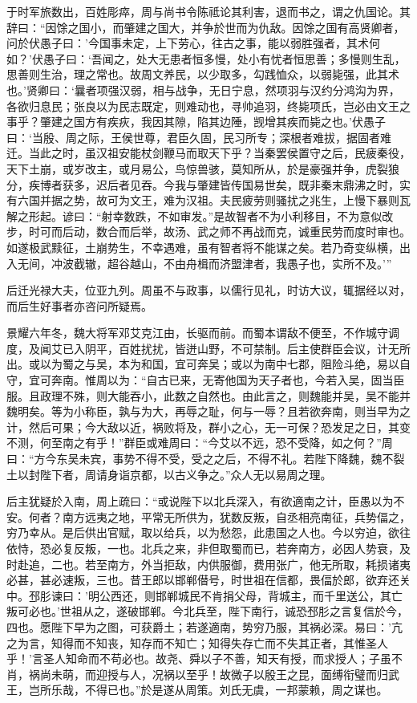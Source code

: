 \documentclass[12pt,UTF8]{ctexbook}
\begin{document}
于时军旅数出，百姓彫瘁，周与尚书令陈祗论其利害，退而书之，谓之仇国论。其辞曰：“因馀之国小，而肇建之国大，并争於世而为仇敌。因馀之国有高贤卿者，问於伏愚子曰：'今国事未定，上下劳心，往古之事，能以弱胜强者，其术何如？'伏愚子曰：‘吾闻之，处大无患者恒多慢，处小有忧者恒思善；多慢则生乱，思善则生治，理之常也。故周文养民，以少取多，勾践恤众，以弱毙强，此其术也。’贤卿曰：‘曩者项强汉弱，相与战争，无日宁息，然项羽与汉约分鸿沟为界，各欲归息民；张良以为民志既定，则难动也，寻帅追羽，终毙项氏，岂必由文王之事乎？肇建之国方有疾疢，我因其隙，陷其边陲，觊增其疾而毙之也。’伏愚子曰：‘当殷、周之际，王侯世尊，君臣久固，民习所专；深根者难拔，据固者难迁。当此之时，虽汉祖安能杖剑鞭马而取天下乎？当秦罢侯置守之后，民疲秦役，天下土崩，或岁改主，或月易公，鸟惊兽骇，莫知所从，於是豪强并争，虎裂狼分，疾博者获多，迟后者见吞。今我与肇建皆传国易世矣，既非秦末鼎沸之时，实有六国并据之势，故可为文王，难为汉祖。夫民疲劳则骚扰之兆生，上慢下暴则瓦解之形起。谚曰：“射幸数跌，不如审发。”是故智者不为小利移目，不为意似改步，时可而后动，数合而后举，故汤、武之师不再战而克，诚重民劳而度时审也。如遂极武黩征，土崩势生，不幸遇难，虽有智者将不能谋之矣。若乃奇变纵横，出入无间，冲波截辙，超谷越山，不由舟楫而济盟津者，我愚子也，实所不及。’”

后迁光禄大夫，位亚九列。周虽不与政事，以儒行见礼，时访大议，辄据经以对，而后生好事者亦咨问所疑焉。

景耀六年冬，魏大将军邓艾克江由，长驱而前。而蜀本谓敌不便至，不作城守调度，及闻艾已入阴平，百姓扰扰，皆迸山野，不可禁制。后主使群臣会议，计无所出。或以为蜀之与吴，本为和国，宜可奔吴；或以为南中七郡，阻险斗绝，易以自守，宜可奔南。惟周以为：“自古已来，无寄他国为天子者也，今若入吴，固当臣服。且政理不殊，则大能吞小，此数之自然也。由此言之，则魏能并吴，吴不能并魏明矣。等为小称臣，孰与为大，再辱之耻，何与一辱？且若欲奔南，则当早为之计，然后可果；今大敌以近，祸败将及，群小之心，无一可保？恐发足之日，其变不测，何至南之有乎！”群臣或难周曰：“今艾以不远，恐不受降，如之何？”周曰：“方今东吴未宾，事势不得不受，受之之后，不得不礼。若陛下降魏，魏不裂土以封陛下者，周请身诣京都，以古义争之。”众人无以易周之理。

后主犹疑於入南，周上疏曰：“或说陛下以北兵深入，有欲適南之计，臣愚以为不安。何者？南方远夷之地，平常无所供为，犹数反叛，自丞相亮南征，兵势偪之，穷乃幸从。是后供出官赋，取以给兵，以为愁怨，此患国之人也。今以穷迫，欲往依恃，恐必复反叛，一也。北兵之来，非但取蜀而已，若奔南方，必因人势衰，及时赴追，二也。若至南方，外当拒敌，内供服御，费用张广，他无所取，耗损诸夷必甚，甚必速叛，三也。昔王郎以邯郸僣号，时世祖在信都，畏偪於郎，欲弃还关中。邳肜谏曰：'明公西还，则邯郸城民不肯捐父母，背城主，而千里送公，其亡叛可必也。'世祖从之，遂破邯郸。今北兵至，陛下南行，诚恐邳肜之言复信於今，四也。愿陛下早为之图，可获爵土；若遂適南，势穷乃服，其祸必深。易曰：'亢之为言，知得而不知丧，知存而不知亡；知得失存亡而不失其正者，其惟圣人乎！'言圣人知命而不苟必也。故尧、舜以子不善，知天有授，而求授人；子虽不肖，祸尚未萌，而迎授与人，况祸以至乎！故微子以殷王之昆，面缚衔璧而归武王，岂所乐哉，不得已也。”於是遂从周策。刘氏无虞，一邦蒙赖，周之谋也。
\end{document}
